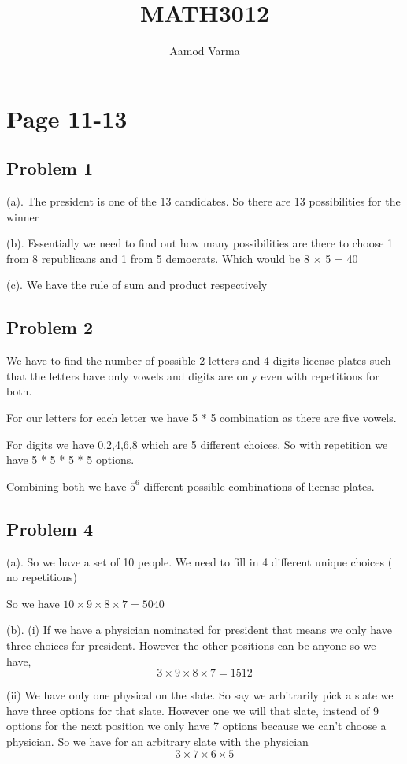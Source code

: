 \documentclass[a4paper]{report}
\title{MATH3012}
\author{Aamod Varma}
\begin{document}
\maketitle


\section*{Page 11-13}
\subsection*{Problem 1}
(a). The president is one of the 13 candidates. So there are 13 possibilities for the winner

(b). Essentially we need to find out how many possibilities are there to choose 1 from 8 republicans and 1 from 5 democrats. Which would be 8 $\times$ 5 = 40

(c). We have the rule of sum and product respectively


\subsection*{Problem 2}
We have to find the number of possible 2 letters and 4 digits license plates such that the letters have only vowels and digits are only even with repetitions for both.

For our letters for each letter we have 5 * 5 combination as there are five vowels. 

For digits we have 0,2,4,6,8 which are 5 different choices. So with repetition we have 5 * 5 * 5 * 5 options.

Combining both we have $5^{6}$ different possible combinations of license plates.


\subsection*{Problem 4}
(a). So we have a set of 10 people. We need to fill in 4 different unique choices ( no repetitions)

So we have $10 \times 9 \times 8 \times 7 = 5040$

(b). (i) If we have a physician nominated for president that means we only have three choices for president. However the other positions can be anyone so we have,  
$$ 3 \times 9 \times 8 \times 7 = 1512 $$ 

(ii) We have only one physical on the slate. So say we arbitrarily pick a slate we have three options for that slate. However one we will that slate, instead of 9 options for the next position we only have 7 options because we can't choose a physician. So we have for an arbitrary slate with the physician
$$ 3 \times 7 \times 6 \times 5 $$ 
\end{document}
